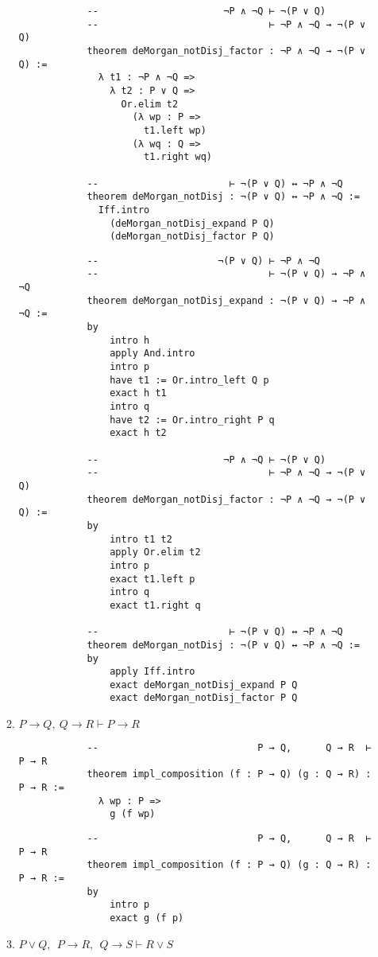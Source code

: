 \documentclass[11pt]{report}
\begin{document}
\begin{enumerate}
\begin{enumerate}
\begin{lstlisting}
			--                      ¬P ∧ ¬Q ⊢ ¬(P ∨ Q)
			--                              ⊢ ¬P ∧ ¬Q → ¬(P ∨ Q)
			theorem deMorgan_notDisj_factor : ¬P ∧ ¬Q → ¬(P ∨ Q) :=
			  λ t1 : ¬P ∧ ¬Q =>
				λ t2 : P ∨ Q =>
				  Or.elim t2
					(λ wp : P =>
					  t1.left wp)
					(λ wq : Q =>
					  t1.right wq)
			
			--                       ⊢ ¬(P ∨ Q) ↔ ¬P ∧ ¬Q
			theorem deMorgan_notDisj : ¬(P ∨ Q) ↔ ¬P ∧ ¬Q :=
			  Iff.intro
				(deMorgan_notDisj_expand P Q)
				(deMorgan_notDisj_factor P Q)
		\end{lstlisting}
		
		\begin{lstlisting}
			--                     ¬(P ∨ Q) ⊢ ¬P ∧ ¬Q
			--                              ⊢ ¬(P ∨ Q) → ¬P ∧ ¬Q
			theorem deMorgan_notDisj_expand : ¬(P ∨ Q) → ¬P ∧ ¬Q :=
			by
				intro h
				apply And.intro
				intro p
				have t1 := Or.intro_left Q p
				exact h t1
				intro q
				have t2 := Or.intro_right P q
				exact h t2

			--                      ¬P ∧ ¬Q ⊢ ¬(P ∨ Q)
			--                              ⊢ ¬P ∧ ¬Q → ¬(P ∨ Q)
			theorem deMorgan_notDisj_factor : ¬P ∧ ¬Q → ¬(P ∨ Q) :=
			by
				intro t1 t2
				apply Or.elim t2
				intro p
				exact t1.left p
				intro q
				exact t1.right q

			--                       ⊢ ¬(P ∨ Q) ↔ ¬P ∧ ¬Q
			theorem deMorgan_notDisj : ¬(P ∨ Q) ↔ ¬P ∧ ¬Q :=
			by
				apply Iff.intro
				exact deMorgan_notDisj_expand P Q
				exact deMorgan_notDisj_factor P Q
		\end{lstlisting}

		\newpage
		\item $ P\rightarrow  Q, \  Q \rightarrow  R \vdash  P\rightarrow  R $
		
		\begin{lstlisting}
			--                            P → Q,      Q → R  ⊢ P → R
			theorem impl_composition (f : P → Q) (g : Q → R) : P → R :=
			  λ wp : P =>
				g (f wp)
		\end{lstlisting}
		
		\begin{lstlisting}
			--                            P → Q,      Q → R  ⊢ P → R
			theorem impl_composition (f : P → Q) (g : Q → R) : P → R :=
			by
				intro p
				exact g (f p)
		\end{lstlisting}		
		
		\newpage
		\item $ P\lor  Q,\ \  P\to  R,\ \  Q \to  S \vdash   R \lor  S$
		

\end{enumerate}
\end{enumerate}
\end{document}
